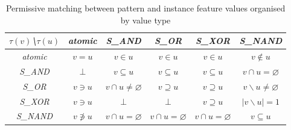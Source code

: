 \begin{table}[!ht]
    \centering
    \begin{tabular}{|c|c|c|c|c|c|}
        \hline
        \textit{$\tau(v)$\textbackslash $\tau(u)$} & \textit{atomic} & \textit{S_{AND}}                 & \textit{S_{OR}}              & \textit{S_{XOR}}             & \textit{S_{NAND}}            \\ \hline
        \textit{atomic}             & $v=u$             & $v \in u$                         & $v \in u$                          & $v \in u$                          & $v \notin u$                   \\ \hline
        \textit{S_{AND}}              & $\bot$               & $v \subseteq u$                     & $v \subseteq u$                          & $v \subseteq u$                          & $v \cap u = \varnothing$ \\ \hline
        \textit{S_{OR}}               & $v \ni u$          & $ v \cap u \neq \varnothing $ &                        $v \supseteq u $              & $v \supseteq u $   & $v \backslash u \neq \varnothing$ \\ \hline
        \textit{S_{XOR}}              & $v \ni u$          & $\bot$                              & $\bot$                        & $v \supseteq u$             & $ |v \backslash u| = 1$ \\ \hline
        \textit{S_{NAND}}             & $v \not\ni u$      & $v \cap u = \varnothing$     & $v \cap u = \varnothing$ & $v \cap u = \varnothing$ & $ v \subseteq u $                          \\ \hline
    \end{tabular}
    \caption{Permissive matching between pattern and instance feature values organised by value type}
    \label{tab:permissive}
\end{table}


